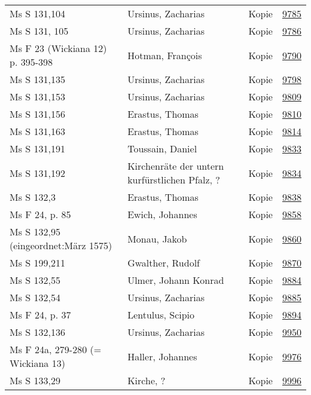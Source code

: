 \documentclass[10pt,a4paper,landscape]{report}
\begin{document}
\begin{longtable}{p{16cm}p{4cm}lr}
Ms S 131,104	&	Ursinus, Zacharias	&	Kopie	&	\href{http://130.60.24.72/assignment/9785}{9785}\\
Ms S 131, 105	&	Ursinus, Zacharias	&	Kopie	&	\href{http://130.60.24.72/assignment/9786}{9786}\\
Ms F 23 (Wickiana 12) p. 395-398	&	Hotman, François	&	Kopie	&	\href{http://130.60.24.72/assignment/9790}{9790}\\
Ms S 131,135	&	Ursinus, Zacharias	&	Kopie	&	\href{http://130.60.24.72/assignment/9798}{9798}\\
Ms S 131,153	&	Ursinus, Zacharias	&	Kopie	&	\href{http://130.60.24.72/assignment/9809}{9809}\\
Ms S 131,156	&	Erastus, Thomas	&	Kopie	&	\href{http://130.60.24.72/assignment/9810}{9810}\\
Ms S 131,163	&	Erastus, Thomas	&	Kopie	&	\href{http://130.60.24.72/assignment/9814}{9814}\\
Ms S 131,191	&	Toussain, Daniel	&	Kopie	&	\href{http://130.60.24.72/assignment/9833}{9833}\\
Ms S 131,192	&	Kirchenräte der untern kurfürstlichen Pfalz, ?	&	Kopie	&	\href{http://130.60.24.72/assignment/9834}{9834}\\
Ms S 132,3	&	Erastus, Thomas	&	Kopie	&	\href{http://130.60.24.72/assignment/9838}{9838}\\
Ms F 24, p. 85	&	Ewich, Johannes	&	Kopie	&	\href{http://130.60.24.72/assignment/9858}{9858}\\
Ms S 132,95 (eingeordnet:März 1575)	&	Monau, Jakob	&	Kopie	&	\href{http://130.60.24.72/assignment/9860}{9860}\\
Ms S 199,211	&	Gwalther, Rudolf	&	Kopie	&	\href{http://130.60.24.72/assignment/9870}{9870}\\
Ms S 132,55	&	Ulmer, Johann Konrad	&	Kopie	&	\href{http://130.60.24.72/assignment/9884}{9884}\\
Ms S 132,54	&	Ursinus, Zacharias	&	Kopie	&	\href{http://130.60.24.72/assignment/9885}{9885}\\
Ms F 24, p. 37	&	Lentulus, Scipio	&	Kopie	&	\href{http://130.60.24.72/assignment/9894}{9894}\\
Ms S 132,136	&	Ursinus, Zacharias	&	Kopie	&	\href{http://130.60.24.72/assignment/9950}{9950}\\
Ms F 24a, 279-280 (= Wickiana 13)	&	Haller, Johannes	&	Kopie	&	\href{http://130.60.24.72/assignment/9976}{9976}\\
Ms S 133,29	&	Kirche, ?	&	Kopie	&	\href{http://130.60.24.72/assignment/9996}{9996}\\

\end{longtable}
\end{document}
